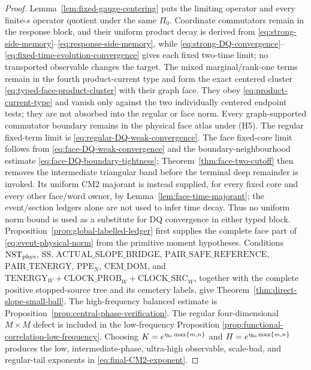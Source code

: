 \documentclass[11pt]{article}
\begin{document}
\begin{proof}
Lemma~\ref{lem:fixed-gauge-centering} puts the limiting operator and every
finite-$s$ operator quotient under the same $\Pi_0$.  Coordinate
commutators remain in the response block, and their uniform product decay is
derived from \eqref{eq:strong-side-memory}--\eqref{eq:response-side-memory},
while \eqref{eq:strong-DQ-convergence}--
\eqref{eq:fixed-time-evolution-convergence} gives each fixed two-time limit; no
transported observable changes the target.  The mixed marginal/rank-one
terms remain in the fourth product-current type and form the exact centered
cluster \eqref{eq:typed-face-product-cluster} with their graph face.
They obey \eqref{eq:product-current-type} and vanish only against the two individually
centered endpoint tests; they are not absorbed into the regular or face
norm.  Every graph-supported
commutator boundary remains in the physical face atlas under \textup{(H5)}.
The regular fixed-term limit is
\eqref{eq:regular-DQ-weak-convergence}.  The face fixed-core limit follows
from \eqref{eq:face-DQ-weak-convergence} and the boundary-neighbourhood
estimate \eqref{eq:face-DQ-boundary-tightness};
Theorem~\ref{thm:face-two-cutoff} then removes the intermediate triangular
band before the terminal deep remainder is invoked.  Its uniform CM2
majorant is instead supplied, for every fixed core and every other
face/word owner, by Lemma~\ref{lem:face-time-majorant}; the event/section
ledgers alone are not used to infer time decay.
Thus no
uniform norm bound is used as a substitute for DQ convergence in either
typed block.
Proposition~\ref{prop:global-labelled-ledger} first supplies the complete face
part of \eqref{eq:event-physical-norm} from the primitive moment hypotheses.
Conditions $\mathrm{NST}_{\rm phys}$, $\mathrm{SS}$,
$\mathrm{ACTUAL\_SLOPE\_BRIDGE}$, $\mathrm{PAIR\_SAFE\_REFERENCE}$,
$\mathrm{PAIR\_TENERGY}$,
$\mathrm{PPE}_{N}$, $\mathrm{CEM\_DOM}$, and
$\mathrm{TENERGY}_{W}+\mathrm{CLOCK\_PROB}_{W}
+\mathrm{CLOCK\_SRC}_{W}$, together with the complete
positive stopped-source tree and its cemetery labels, give
Theorem~\ref{thm:direct-slope-small-ball}.  The high-frequency balanced
estimate is Proposition~\ref{prop:central-phase-verification}.  The regular
four-dimensional $M\times M$ defect is included in the low-frequency Proposition
\ref{prop:functional-correlation-low-frequency}.  Choosing
$K=e^{\eta_{\rm lo}\max\{m,n\}}$ and
$H=e^{\eta_{\rm hi}\max\{m,n\}}$ produces the low, intermediate-phase,
ultra-high observable, scale-bad, and regular-tail exponents in
\eqref{eq:final-CM2-exponent}.


\end{proof}
\end{document}
